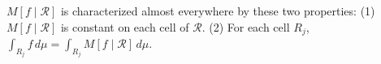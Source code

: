$M[f \mid \mathcal{R}]$ is characterized almost everywhere by these two properties:
(1) $M[f \mid \mathcal{R}]$ is constant on each cell of $\mathcal{R}$.
(2) For each cell $R_j$, $\int_{R_j} f\, d\mu = \int_{R_j} M[f \mid \mathcal{R}]\, d\mu$.
